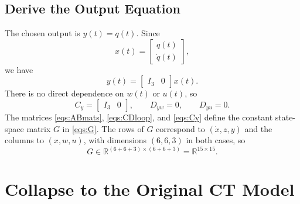 \documentclass[11pt]{article}
\newcommand{\R}{\mathbb{R}}
\begin{document}
\subsection{Derive the Output Equation}

The chosen output is $y(t)=q(t)$. Since
\[
x(t) =
\begin{bmatrix}
    q(t) \\
    \dot{q}(t)
\end{bmatrix},
\]
we have
\begin{equation}
    y(t) =
    \begin{bmatrix}
        I_3 & 0
    \end{bmatrix}
    x(t).
    \label{eqs:yfromx}
\end{equation}
There is no direct dependence on $w(t)$ or $u(t)$, so
\begin{equation}
    C_y =
    \begin{bmatrix}
        I_3 & 0
    \end{bmatrix},
    \qquad
    D_{yw} = 0,
    \qquad
    D_{yu} = 0.
    \label{eqs:Cy}
\end{equation}
The matrices \eqref{eqs:ABmats}, \eqref{eqs:CDloop}, and \eqref{eqs:Cy} define
the constant state-space matrix $G$ in \eqref{eqs:G}. The rows of $G$ correspond to $(\dot{x}, z, y)$ and the columns to $(x, w, u)$,
with dimensions $(6, 6, 3)$ in both cases, so
\[
G \in \R^{(6+6+3)\times(6+6+3)} = \R^{15\times15}.
\]

\section{Collapse to the Original CT Model}
\end{document}
